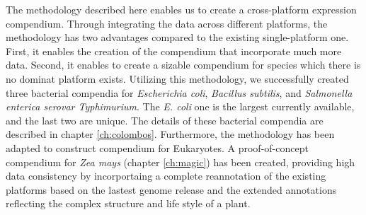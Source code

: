 The methodology described here enables us to create a cross-platform
expression compendium.
%
Through integrating the data across different platforms, the methodology has
two advantages compared to the existing single-platform one.  First, it
enables the creation of the compendium that incorporate much more data.
Second, it enables to create a sizable compendium for species which there is
no dominat platform exists.
%
Utilizing this methodology, we successfully created three bacterial
compendia for {\it Escherichia coli}, {\it Bacillus subtilis}, and {\it
  Salmonella enterica serovar Typhimurium}.  The \textit{E. coli} one is
the largest currently available, and the last two are unique.
%
The details of these bacterial compendia are described in chapter
\ref{ch:colombos}.
%
Furthermore, the methodology has been adapted to construct compendium for
Eukaryotes.
%
A proof-of-concept compendium for \textit{Zea mays} (chapter \ref{ch:magic})
has been created, providing high data consistency by incorportaing a complete
reannotation of the existing platforms based on the lastest genome release and
the extended annotations reflecting the complex structure and life style of a
plant.



















\cleardoublepage



